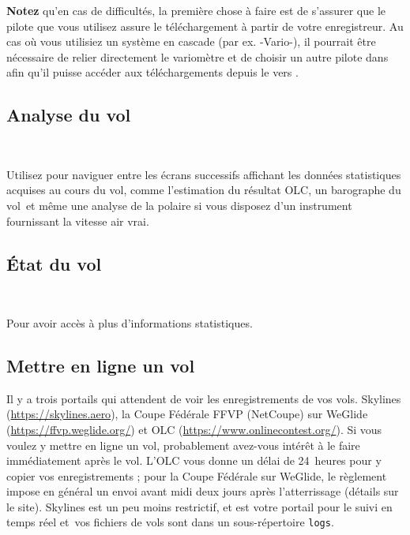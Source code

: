 \documentclass[french, a4paper, 12pt]{refrep}
\newcommand{\info}[3]{\bmenut{Info}{#1/3}{\LARGE$\triangleright$}~\bmenut{#2}{#3}}%
\begin{document}

\textbf{Notez} qu'en cas de difficultés, la première chose à faire est de s'assurer que le pilote
que vous utilisez assure le téléchargement à partir de votre enregistreur. Au cas où vous utilisiez un système
en cascade (par ex. \fl-Vario-\xc), il pourrait être nécessaire de relier directement
le variomètre et de choisir un autre pilote dans \xc{} afin qu'il puisse accéder aux
téléchargements depuis le \fl{} vers \xc.

\subsection{\textcolor{flashblue}{Analyse du vol}}
\begin{flushleft}\hspace*{1cm}\info{1}{Analyse}{}\\\end{flushleft}
Utilisez \bmenuw{\blink} pour naviguer entre les écrans successifs affichant les données statistiques
acquises au cours du vol, comme l'estimation du résultat OLC, un barographe du vol\textellipsis\
 et même une analyse de la polaire si vous disposez d'un instrument
fournissant la vitesse air vrai.

\subsection{\textcolor{flashblue}{État du vol}}
\begin{flushleft}\hspace*{1cm}\info{2}{État}{}\blink{}\\\end{flushleft}
Pour avoir accès à plus d'informations statistiques.

\subsection{\textcolor{flashblue}{Mettre en ligne un vol}}

Il y a trois portails qui attendent de voir les enregistrements de vos vols.
Skylines (\url{https://skylines.aero}), la Coupe Fédérale FFVP (NetCoupe) sur WeGlide (\url{https://ffvp.weglide.org/})
et OLC (\url{https://www.onlinecontest.org/}).
Si vous voulez y mettre en ligne un vol, probablement avez-vous intérêt à le faire immédiatement après le vol. L'OLC vous donne un délai de 24~heures pour y copier vos enregistrements ; pour la Coupe Fédérale sur WeGlide, le règlement impose en général un envoi avant midi deux jours après l'atterrissage (détails sur le site).
Skylines est un peu moins restrictif, et est votre portail pour le suivi en temps réel et\textellipsis\
vos fichiers de vols sont dans un sous-répertoire \texttt{logs}.
\end{document}
